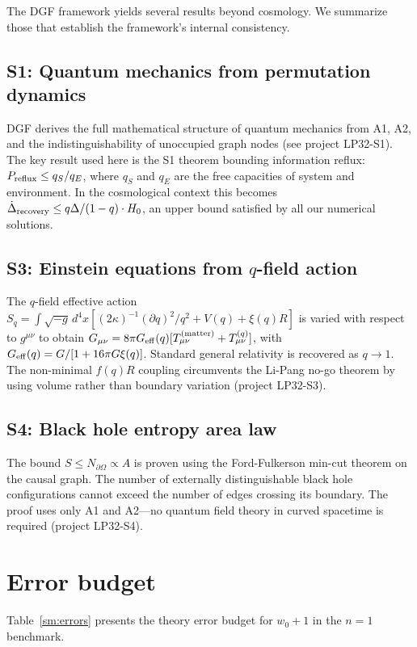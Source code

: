 \documentclass[12pt,a4paper]{article}
\begin{document}
The DGF framework yields several results beyond cosmology. We summarize those that establish the framework's internal consistency.

\subsection{S1: Quantum mechanics from permutation dynamics}

DGF derives the full mathematical structure of quantum mechanics from A1, A2, and the indistinguishability of unoccupied graph nodes (see project LP32-S1). The key result used here is the S1 theorem bounding information reflux: $P_{\rm reflux}\leq q_S/q_E$, where $q_S$ and $q_E$ are the free capacities of system and environment. In the cosmological context this becomes $\dot{\Delta}_{\rm recovery}\leq q\Delta/(1-q)\cdot H_0$, an upper bound satisfied by all our numerical solutions.

\subsection{S3: Einstein equations from $q$-field action}

The $q$-field effective action $S_q=\int\sqrt{-g}\,d^4x[(2\kappa)^{-1}(\partial q)^2/q^2+V(q)+\xi(q)R]$ is varied with respect to $g^{\mu\nu}$ to obtain $G_{\mu\nu}=8\pi G_{\rm eff}(q)[T_{\mu\nu}^{\rm(matter)}+T_{\mu\nu}^{(q)}]$, with $G_{\rm eff}(q)=G/[1+16\pi G\xi(q)]$. Standard general relativity is recovered as $q\to1$. The non-minimal $f(q)R$ coupling circumvents the Li-Pang no-go theorem by using volume rather than boundary variation (project LP32-S3).

\subsection{S4: Black hole entropy area law}

The bound $S\leq N_{\partial\Omega}\propto A$ is proven using the Ford-Fulkerson min-cut theorem on the causal graph. The number of externally distinguishable black hole configurations cannot exceed the number of edges crossing its boundary. The proof uses only A1 and A2---no quantum field theory in curved spacetime is required (project LP32-S4).

\section{Error budget}

Table~\ref{sm:errors} presents the theory error budget for $w_0+1$ in the $n=1$ benchmark.
\end{document}
